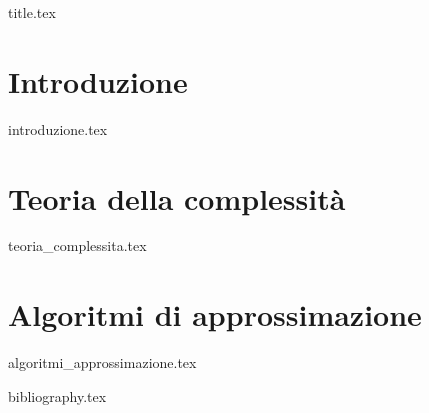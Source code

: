 \documentclass[a4paper,11pt,oneside]{book}
\begin{document}

\frontmatter

{title.tex}

\tableofcontents

\mainmatter


\chapter{Introduzione}
{introduzione.tex}


\chapter{Teoria della complessità}
{teoria_complessita.tex}

\chapter{Algoritmi di approssimazione}
{algoritmi_approssimazione.tex}

\cleardoublepage

{bibliography.tex}
\end{document}
